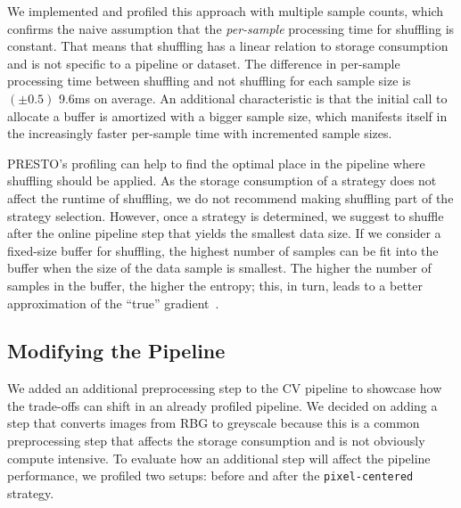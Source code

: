 We implemented and profiled this approach with multiple sample counts, which confirms the naive assumption that the \textit{per-sample} processing time for shuffling is constant.
That means that shuffling has a linear relation to storage consumption and is not specific to a pipeline or dataset.
The difference in per-sample processing time between shuffling and not shuffling for each sample size is $(\pm0.5)$ 9.6ms on average.
An additional characteristic is that the initial call to allocate a buffer is amortized with a bigger sample size, which manifests itself in the increasingly faster per-sample time with incremented sample sizes. 

PRESTO's profiling can help to find the optimal place in the pipeline where shuffling should be applied.
As the storage consumption of a strategy does not affect the runtime of shuffling, we do not recommend making shuffling part of the strategy selection.
However, once a strategy is determined, we suggest to shuffle after the online pipeline step that yields the smallest data size.
If we consider a fixed-size buffer for shuffling, the highest number of samples can be fit into the buffer when the size of the data sample is smallest.
The higher the number of samples in the buffer, the higher the entropy; this, in turn, leads to a better approximation of the ``true'' gradient~\cite{ruder2016overview,kingma2014adam}.

{\color{diff}

\subsection{Modifying the Pipeline}
\label{ssec:modifying-pipeline}

We added an additional preprocessing step to the CV pipeline to showcase how the trade-offs can shift in an already profiled pipeline.
We decided on adding a step that converts images from RBG to greyscale because this is a common preprocessing step that affects the storage consumption and is not obviously compute intensive.
To evaluate how an additional step will affect the pipeline performance, we profiled two setups: before and after the \texttt{pixel-centered} strategy.

}

